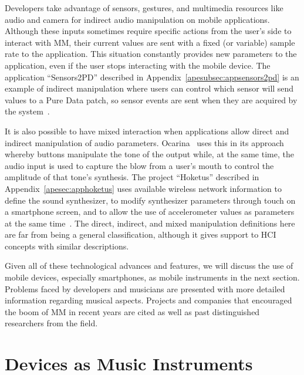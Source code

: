 Developers take advantage of sensors, gestures, and  multimedia resources like audio and camera for indirect audio manipulation on mobile applications.
Although these inputs sometimes require specific actions from the user's side to interact with MM, their current values are sent with a fixed (or variable) sample rate to the application.
This situation constantly provides new parameters to the application, even if the user stops interacting with the mobile device.
The application ``Sensors2PD'' described in Appendix~\ref{apesubsec:appsensors2pd} is an example of indirect manipulation where users can control which sensor will send values to a Pure Data patch, so sensor events are sent when they are acquired by the system~\citep{deCarvalhoJunior2014sensors2pd}.

It is also possible to have mixed interaction when applications allow direct and indirect manipulation of audio parameters.
Ocarina~\citep{Wang2014ocarina} uses this in its approach whereby buttons manipulate the tone of the output while, at the same time, the audio input is used to capture the blow from a user's mouth to control the amplitude of that tone's synthesis.
The project ``Hoketus'' described in Appendix~\ref{apesec:apphoketus} uses available wireless network information to define the sound synthesizer, to modify synthesizer parameters through touch on a smartphone screen, and to allow the use of accelerometer values as parameters at the same time~\citep{Bandeira2014notes,deCarvalhoJunior2015indoor}.
The direct, indirect, and mixed manipulation definitions here are far from being a general classification, although it gives support to HCI concepts with similar descriptions.

Given all of these technological advances and features, we will discuss the use of mobile devices, especially smartphones, as mobile instruments in the next section.
Problems faced by developers and musicians are presented with more detailed information regarding musical aspects.
Projects and companies that encouraged the boom of MM in recent years are cited as well as past distinguished researchers from the field.

\section{Devices as Music Instruments}
\label{sec:mobileinstruments}

